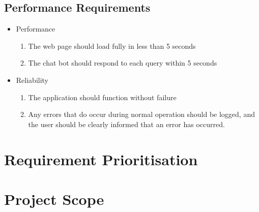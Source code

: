 \subsection{Performance Requirements}
\begin{itemize}
	\item Performance
	\begin{enumerate}[label*=P\arabic*.]
		\item The web page should load fully in less than 5 seconds
		\item The chat bot should respond to each query within 5 seconds
	\end{enumerate}
	\item Reliability
	\begin{enumerate}[resume*]
		\item The application should function without failure
		\item Any errors that do occur during normal operation should be logged, and the user should be clearly informed that an error has occurred.
	\end{enumerate}
\end{itemize}

\section{Requirement Prioritisation}

\section{Project Scope}